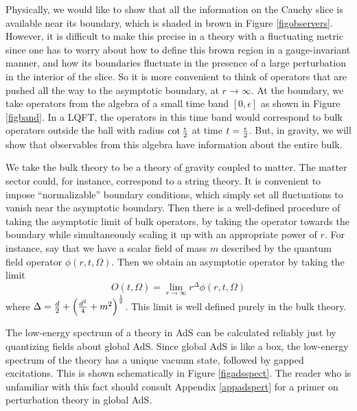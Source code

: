 \documentclass[12pt]{article}
\newcommand{\be}{\begin{equation}}
\newcommand{\ee}{\end{equation}}
\begin{document}
Physically, we would like to show that all the information on the Cauchy slice is available near its boundary, which is shaded in brown in Figure \ref{figobservers}. However, it is difficult to make this precise in a theory with a fluctuating metric since one has to worry about how to define this brown region in a gauge-invariant manner, and how its boundaries fluctuate in the presence of a large perturbation in the interior of the slice. So it is more convenient to think of operators that are pushed all the way to the asymptotic boundary, at
$r \rightarrow \infty$. At the boundary, we take operators from the algebra of a small time band $[0, \epsilon]$ as shown in Figure \ref{figband}.   In a LQFT, the operators in this time band would correspond to bulk operators outside the ball with radius $\cot{{\epsilon \over 2}}$ at time  $t = {\epsilon \over 2}$. But, in gravity, we will show that observables from this algebra have information about the entire bulk.

We take the bulk theory to be a theory of gravity coupled to matter.  The matter sector could, for instance, correspond to a string theory. It is convenient to impose ``normalizable'' boundary conditions, which simply set all fluctuations to vanish near the asymptotic boundary. Then there is a well-defined procedure of taking the asymptotic limit of bulk operators, by taking the operator towards the boundary while simultaneously scaling it up with an appropriate power of $r$.
For instance, say that we have a scalar field of mass $m$ described by the quantum field operator $\phi(r,t, \Omega)$. Then we obtain an asymptotic operator by taking the limit
\be
O(t, \Omega) = \lim_{r \rightarrow \infty} r^{\Delta} \phi(r, t, \Omega)
\ee
where $\Delta = {d \over 2} + \left({d^2 \over 4} + m^2 \right)^{1 \over 2}$. This limit is well defined purely in the bulk theory.





The low-energy spectrum of a theory in AdS can be calculated reliably just by quantizing fields about global AdS. Since global AdS is like a box, the low-energy spectrum of the theory has a unique vacuum state, followed by gapped excitations. This is shown schematically in Figure \ref{figadsspect}. The reader who is unfamiliar with this fact should consult Appendix \ref{appadspert} for a primer on perturbation theory in global AdS.
\end{document}
